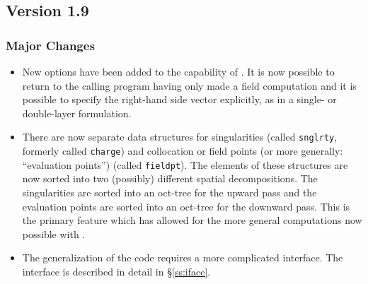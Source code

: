\subsection{Version 1.9}
\label{ss:release19}
\subsubsection{Major Changes}
\begin{itemize}
\item{New options have been added to the capability of \fas.
It is now possible to return to the calling program having only made
a field computation and it is possible to specify the right-hand side
vector explicitly, as in a single- or double-layer formulation.}

\item{There are now separate data structures for singularities 
(called {\tt snglrty}, formerly called {\tt charge}) and collocation 
or field points (or more generally: ``evaluation points'') 
(called {\tt fieldpt}).  The elements of these structures 
are now sorted into two (possibly) different spatial decompositions.  The
singularities are sorted into an oct-tree for the upward pass and
the evaluation points are sorted into an oct-tree for the downward pass.
This is the primary feature which has allowed for the more general 
computations now possible with \fas.}

\item{The generalization of the code requires a more complicated interface.
The interface is described in detail in \S\ref{ss:iface}.}
\end{itemize}

